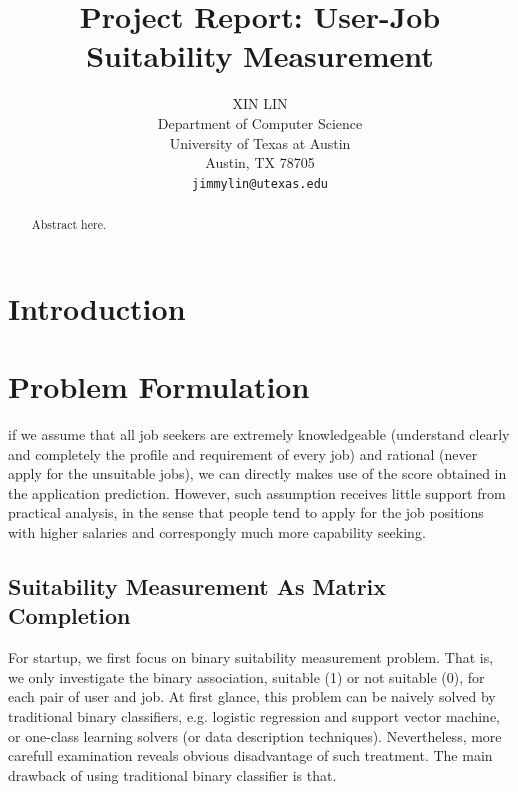 \documentclass{article} %
\title{Project Report: User-Job Suitability Measurement}
\author{
XIN LIN \\
Department of Computer Science\\
University of Texas at Austin \\
Austin, TX 78705 \\
\texttt{jimmylin@utexas.edu} \\
}
\begin{document}
\maketitle

\begin{abstract}
    Abstract here.
\end{abstract}




\section{Introduction}

\section{Problem Formulation}

if we assume that all job seekers are extremely knowledgeable (understand
clearly and completely the profile and requirement of every job) and rational
(never apply for the unsuitable jobs), we can directly makes use of the score
obtained in the application prediction. However, such assumption receives
little support from practical analysis, in the sense that people tend to apply
for the job positions with higher salaries and correspongly much more
capability seeking.

\subsection{Suitability Measurement As Matrix Completion}
For startup, we first focus on binary suitability measurement problem. That
is, we only investigate the binary association, suitable (1) or not suitable
(0), for each pair of user and job. 
At first glance, this problem can be naively solved by traditional binary
classifiers, e.g. logistic regression and support vector machine, or one-class
learning solvers (or data description techniques).
Nevertheless, more carefull examination reveals obvious disadvantage of such
treatment. The main drawback of using traditional binary classifier is that.
\end{document}
